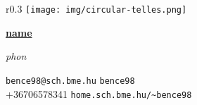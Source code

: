 \documentclass[10pt, oneside, final]{article}
\newcommand{\namestyle}{short}
\newcommand{\occupation}{\occupEmbDev}
\newcommand{\firmname}{\firmProlan}
\newcommand{\dispname}{\expandafter\csname\namestyle name\endcsname}
\newcommand{\phonetic}{\expandafter\csname\namestyle phon\endcsname}
\begin{document}
  \thispagestyle{empty}
  
  \begin{wrapfigure}{r}{0.3\textwidth}
  \texttt{[image: img/circular-telles.png]}
  \end{wrapfigure}

  \underline{\large\textsf{\textbf{\dispname}}}\vspace{2pt}\\
  {\tiny\emph{\phonetic}\par}

  {\firmname}

  \emph{\occupation}

  \vfill 
  {\faEnvelope} \texttt{bence98@sch.bme.hu} \hfill 
  {\faGithub} \texttt{bence98} \\
  {\faPhone} +36{\textendash}70{\textendash}657{\textendash}8341 \hfill 
  {\faGlobe} \texttt{home.sch.bme.hu/\textasciitilde bence98}
  
\end{document}
